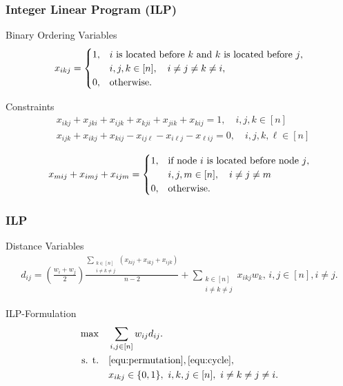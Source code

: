 \documentclass[xcolor=dvipsnames]{beamer}
\numberwithin{bsp}{section}
\numberwithin{figure}{section}
\begin{document}
\begin{frame}
	\frametitle{Integer Linear Program (ILP)}
	\begin{block}{Binary Ordering Variables}
		$$ x_{ikj} = \begin{cases} 1, & \text{$i$ is located before $k$ and $k$ is located before $j$},\\
		& \hphantom{} i, j, k \in [n], \quad i \neq j \neq k \neq i,\\
		0, & \text{otherwise}. \\
		\end{cases} $$
	\end{block}
	\begin{block}{Constraints}
		\vspace{-0.5cm}
		\begin{align}
		&x_{ikj} + x_{jki} + x_{ijk} + x_{kji} + x_{jik} + x_{kij} = 1, \quad i, j, k \in [n]\label{equ:permutation} \\
		&x_{ijk} + x_{ikj} + x_{kij} - x_{ij\ell} - x_{i\ell j} - x_{\ell ij} = 0, \quad i, j, k, \ell \in [n]\label{equ:cycle}
		\end{align}
	\end{block}
	$$ x_{mij} + x_{imj} + x_{ijm} = \begin{cases} 1, & \text{if node $i$ is located before node $j$},\\
	& \hphantom{} i, j, m \in [n], \quad i \neq j \neq m\\
	0, & \text{otherwise}. \\
	\end{cases} $$
\end{frame}

\begin{frame}
	\frametitle{ILP}
	\begin{block}{Distance Variables}
		\begin{align*}d_{ij} = \left(\frac{w_i+w_j}{2}\right)\frac{\sum_{\substack{k \in [n]\\ i \neq k \neq j }}\left(x_{kij} + x_{ikj} + x_{ijk}\right)}{n - 2} + \sum_{\substack{k \in [n]\\ i \neq k \neq j }}{x_{ikj} w_k}, \, i,j \in [n], i\neq j.\end{align*}
	\end{block}
	\begin{block}{ILP-Formulation}
		\vspace{-0.5cm}
		\begin{align*}
		\max \quad&\sum_{\substack{i,j \in [n]}} w_{ij}d_{ij}.\\
		\text{s. t.} \quad& \eqref{equ:permutation}, \eqref{equ:cycle},\\
		&x_{ikj} \in \{0,1\}, \ i,k,j \in [n], \ i\neq k \neq j \neq i.
		\end{align*}
	\end{block}
\end{frame}
\end{document}

